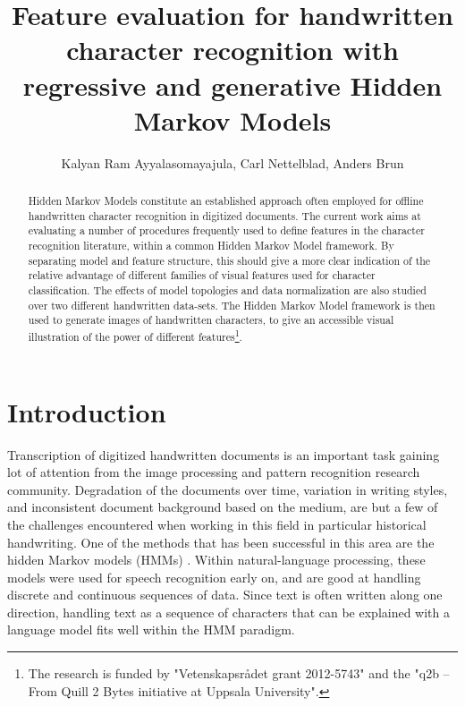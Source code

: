 \documentclass[runningheads]{llncs}
\begin{document}
\pagestyle{headings}

\mainmatter

\title{Feature evaluation for handwritten character recognition with regressive and generative Hidden Markov Models}

\author{Kalyan Ram Ayyalasomayajula, Carl Nettelblad, Anders Brun}
\maketitle

\begin{abstract}
Hidden Markov Models constitute an established approach often employed for offline handwritten character recognition in digitized documents. The current work aims at evaluating a number of procedures frequently used to define features in the character recognition literature, within a common Hidden Markov Model framework. By separating model and feature structure, this should give a more clear indication of the relative advantage of different families of visual features used for character classification. The effects of model topologies and data normalization are also studied over two different handwritten data-sets. The Hidden Markov Model framework is then used to generate images of handwritten characters, to give an accessible visual illustration of the power of different features\footnote{The research is funded by "Vetenskapsr\r{a}det grant 2012-5743" and the "q2b -- From Quill 2 Bytes initiative at Uppsala University".}.
\end{abstract}

\section{Introduction}
\label{sec:intro}
Transcription of digitized handwritten documents is an important task gaining lot of attention from the image processing and pattern recognition research community. Degradation of the documents over time, variation in writing styles, and inconsistent document background based on the medium, are but a few of the challenges encountered when working in this field in particular historical handwriting. One of the methods that has been successful in this area are the hidden Markov models (HMMs) \cite{Fink09}. Within natural-language processing, these models were used for speech recognition early on, and are good at handling discrete and continuous sequences of data. Since text is often written along one direction, handling text as a sequence of characters that can be explained with a language model fits well within the HMM paradigm.
\end{document}
